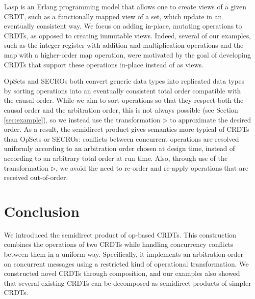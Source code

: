\documentclass[acmsmall,nonacm]{acmart}
\newcommand{\msf}[1]{\ensuremath{\mathsf{#1}}}
\newcommand{\act}{\triangleright}
\theoremstyle{plain}
\theoremstyle{definition}
\begin{document}
Lasp \cite{lasp} is an Erlang programming model that allows one to create views of a given CRDT, such as a functionally mapped view of a set, which update in an eventually consistent way.  We focus on adding in-place, mutating operations to CRDTs, as opposed to creating immutable views.  Indeed, several of our examples, such as the integer register with addition and multiplication operations and the map with a higher-order map operation, were motivated by the goal of developing CRDTs that support these operations in-place instead of as views.


OpSets \cite{opsets} and SECROs \cite{generic_rdt} both convert generic data types into replicated data types by sorting operations into an eventually consistent total order compatible with the causal order.  While we aim to sort operations so that they respect both the causal order and the arbitration order, this is not always possible (see Section \ref{sec:example}), so we instead use the transformation $\act$ to approximate the desired order.  As a result, the semidirect product gives semantics more typical of CRDTs than OpSets or SECROs: conflicts between concurrent operations are resolved uniformly according to an arbitration order chosen at design time, instead of according to an arbitrary total order at run time.  Also, through use of the transformation $\act$, we avoid the need to re-order and re-apply operations that are received out-of-order.






\section{Conclusion}
We introduced the semidirect product of op-based CRDTs.  This construction combines the operations of two CRDTs while handling concurrency conflicts between them in a uniform way.  Specifically, it implements an arbitration order on concurrent messages using a restricted kind of operational transformation.  We constructed novel CRDTs through composition, and our examples also showed that several existing CRDTs can be decomposed as semidirect products of simpler CRDTs.
\end{document}
